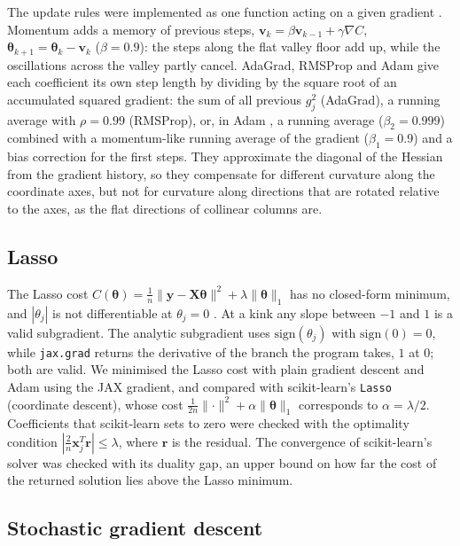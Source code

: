 The update rules were implemented as one function acting on a given gradient \cite[Secs.~4.6, 4.8--4.11]{HjorthJensen2026}. Momentum adds a memory of previous steps, $\mathbf{v}_k = \beta\mathbf{v}_{k-1} + \gamma\nabla C$, $\boldsymbol{\theta}_{k+1} = \boldsymbol{\theta}_k - \mathbf{v}_k$ ($\beta = 0.9$): the steps along the flat valley floor add up, while the oscillations across the valley partly cancel. AdaGrad, RMSProp and Adam give each coefficient its own step length by dividing by the square root of an accumulated squared gradient: the sum of all previous $g_j^2$ (AdaGrad), a running average with $\rho = 0.99$ (RMSProp), or, in Adam \cite{Kingma2015}, a running average ($\beta_2 = 0.999$) combined with a momentum-like running average of the gradient ($\beta_1 = 0.9$) and a bias correction for the first steps. They approximate the diagonal of the Hessian from the gradient history, so they compensate for different curvature along the coordinate axes, but not for curvature along directions that are rotated relative to the axes, as the flat directions of collinear columns are.

\subsection{Lasso}\label{sec:lasso}

The Lasso cost $C(\boldsymbol{\theta}) = \frac{1}{n}\lVert\mathbf{y} - \mathbf{X}\boldsymbol{\theta}\rVert^2 + \lambda\lVert\boldsymbol{\theta}\rVert_1$ has no closed-form minimum, and $|\theta_j|$ is not differentiable at $\theta_j = 0$ \cite{Tibshirani1996}. At a kink any slope between $-1$ and $1$ is a valid subgradient. The analytic subgradient uses $\mathrm{sign}(\theta_j)$ with $\mathrm{sign}(0) = 0$, while \texttt{jax.grad} returns the derivative of the branch the program takes, $1$ at $0$; both are valid. We minimised the Lasso cost with plain gradient descent and Adam using the JAX gradient, and compared with scikit-learn's \texttt{Lasso} (coordinate descent), whose cost $\frac{1}{2n}\lVert\cdot\rVert^2 + \alpha\lVert\boldsymbol{\theta}\rVert_1$ corresponds to $\alpha = \lambda/2$. Coefficients that scikit-learn sets to zero were checked with the optimality condition $|\frac{2}{n}\mathbf{x}_j^T\mathbf{r}| \le \lambda$, where $\mathbf{r}$ is the residual. The convergence of scikit-learn's solver was checked with its duality gap, an upper bound on how far the cost of the returned solution lies above the Lasso minimum.

\subsection{Stochastic gradient descent}\label{sec:sgd}

